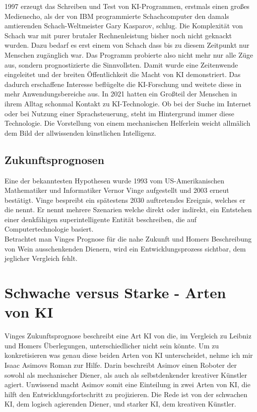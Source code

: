 \documentclass[12pt,german,ngerman]{report}
\begin{document}
    1997 erzeugt das Schreiben und Test von KI-Programmen, erstmals einen großes Medienecho, 
    als der von IBM programmierte Schachcomputer
     den damals amtierenden Schach-Weltmeister Gary Kasparov, schlug.\cite{chessbase2017kasparovdeepblue} 
    Die Komplexität von Schach war mit purer brutaler
    Rechnenleistung bisher noch nicht geknackt wurden. Dazu bedarf es erst einem  von Schach dass bis zu diesem
    Zeitpunkt nur Menschen zugänglich war. Das Programm probierte also nicht mehr nur alle Züge aus, sondern prognostizierte die 
    Sinnvollsten. Damit wurde eine Zeitenwende eingeleitet und der breiten Öffentlichkeit die Macht von KI demonstriert.
    Das dadurch erschaffene Interesse beflügelte die KI-Forschung und weitete diese in mehr Anwendungsbereiche aus.
    In 2021 hatten ein Großteil der Menschen in ihrem Alltag schonmal Kontakt zu KI-Technologie. 
    Ob bei der Suche im Internet oder bei Nutzung einer Sprachsteuerung, steht im Hintergrund immer diese Technologie.
    Die Vorstellung von einem mechanischen Helferlein weicht allmälich dem Bild der allwissenden künstlichen Intelligenz.
    \section{Zukunftsprognosen}
    Eine der bekanntesten Hypothesen wurde 1993 vom US-Amerikanischen Mathematiker und 
    Informatiker Vernor Vinge aufgestellt und 2003
    erneut bestätigt. Vinge bespreibt ein spätestens 2030 auftretendes Ereignis, 
    welches er die \cite[1]{vinge1993technological} nennt. 
    Er nennt mehrere Szenarien welche direkt oder indirekt, 
    ein Entstehen einer denkfähigen superintelligente Entität beschreiben, 
    die auf Computertechnologie basiert.\\
    
    Betrachtet man Vinges Prognose für die nahe Zukunft
    und Homers Beschreibung von Wein ausschenkenden Dienern,
    wird ein Entwicklungsprozess sichtbar, dem jeglicher Vergleich fehlt. 



\chapter{Schwache versus Starke - Arten von KI}
    Vinges Zukunftsprognose\cite[1]{vinge1993technological} beschreibt eine Art KI von die,
    im Vergleich zu Leibniz und Homers Überlegungen, unterschiedlicher nicht sein könnte.
    Um zu konkretisieren was genau diese beiden Arten von KI unterscheidet, nehme ich
    mir Isaac Asimovs Roman  zur Hilfe.
    Darin beschreibt Asimov einen Roboter der sowohl als mechanischer Diener, als
    auch als selbstdenkender kreativer Künstler agiert.\cite{asimov2000der}
    Unwissend macht Asimov somit eine Einteilung in zwei Arten von KI,
    die hilft den Entwicklungsfortschritt zu projizieren.
    Die Rede ist von der schwachen KI, dem logisch agierenden Diener, und
    starker KI, dem kreativen Künstler.
\end{document}
